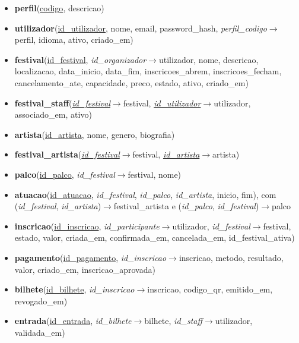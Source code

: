 \begin{itemize}\small
  \item \textbf{perfil}(\underline{codigo}, descricao)
  \item \textbf{utilizador}(\underline{id\_utilizador}, nome, email, password\_hash,
        \textit{perfil\_codigo}$\rightarrow$perfil, idioma, ativo, criado\_em)
  \item \textbf{festival}(\underline{id\_festival}, \textit{id\_organizador}$\rightarrow$utilizador,
        nome, descricao, localizacao, data\_inicio, data\_fim, inscricoes\_abrem,
        inscricoes\_fecham, cancelamento\_ate, capacidade, preco, estado, ativo,
        criado\_em)
  \item \textbf{festival\_staff}(\underline{\textit{id\_festival}}$\rightarrow$festival,
        \underline{\textit{id\_utilizador}}$\rightarrow$utilizador, associado\_em, ativo)
  \item \textbf{artista}(\underline{id\_artista}, nome, genero, biografia)
  \item \textbf{festival\_artista}(\underline{\textit{id\_festival}}$\rightarrow$festival,
        \underline{\textit{id\_artista}}$\rightarrow$artista)
  \item \textbf{palco}(\underline{id\_palco}, \textit{id\_festival}$\rightarrow$festival, nome)
  \item \textbf{atuacao}(\underline{id\_atuacao}, \textit{id\_festival}, \textit{id\_palco},
        \textit{id\_artista}, inicio, fim), com
        (\textit{id\_festival}, \textit{id\_artista})$\rightarrow$festival\_artista e
        (\textit{id\_palco}, \textit{id\_festival})$\rightarrow$palco
  \item \textbf{inscricao}(\underline{id\_inscricao}, \textit{id\_participante}$\rightarrow$utilizador,
        \textit{id\_festival}$\rightarrow$festival, estado, valor, criada\_em,
        confirmada\_em, cancelada\_em, id\_festival\_ativa)
  \item \textbf{pagamento}(\underline{id\_pagamento}, \textit{id\_inscricao}$\rightarrow$inscricao,
        metodo, resultado, valor, criado\_em, inscricao\_aprovada)
  \item \textbf{bilhete}(\underline{id\_bilhete}, \textit{id\_inscricao}$\rightarrow$inscricao,
        codigo\_qr, emitido\_em, revogado\_em)
  \item \textbf{entrada}(\underline{id\_entrada}, \textit{id\_bilhete}$\rightarrow$bilhete,
        \textit{id\_staff}$\rightarrow$utilizador, validada\_em)
\end{itemize}


